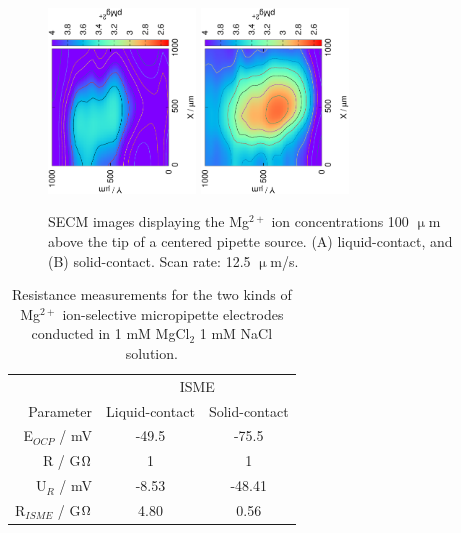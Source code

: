 \begin{figure}
\centering
\includegraphics[trim = 10mm 30mm 0mm 20mm, clip, width=0.35\textwidth, angle=-90]{img/mg_pipette/liquid_Mg.eps} \includegraphics[trim = 10mm 30mm 0mm 20mm, clip, width=0.35\textwidth, angle=-90]{img/mg_pipette/solid_Mg.eps}
\caption[SECM images displaying the Mg$^{2+}$ ion concentrations 100 $\upmu$m above the tip of a centered pipette source.]{SECM images displaying the Mg$^{2+}$ ion concentrations 100 $\upmu$m above the tip of a centered pipette source.
(A) liquid-contact, and (B) solid-contact.
Scan rate: 12.5 $\upmu$m/s.}
\label{fig:solid_liquid_pipette}
\end{figure}


\begin{table}
                \caption[Resistance measurements for the two kinds of Mg$^{2+}$ ion-selective micropipette electrodes.]{Resistance measurements for the two kinds of Mg$^{2+}$ ion-selective micropipette electrodes conducted in 1 mM MgCl$_2$  1 mM NaCl solution.}
                \label{table:comp}
                \centering
                \begin{tabular}{r c c}
			& \multicolumn{2}{c}{ISME}\\
			\cline{2-3}
                        Parameter & Liquid-contact & Solid-contact \\
                        \hline
                        E$_{OCP}$ / mV & -49.5 & -75.5 \\
                        R / G$\ohm $ & 1 & 1 \\
                        U$_R$ / mV & -8.53 & -48.41 \\
                        R$_{ISME}$ / G$\ohm $ & 4.80 & 0.56 \\
                \end{tabular}
\end{table}

